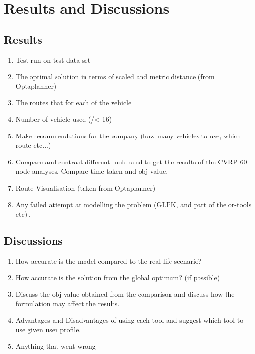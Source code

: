 \chapter{Results and Discussions}
\section{Results}
\begin{enumerate}
\item Test run on test data set
\item The optimal solution in terms of scaled and metric distance (from Optaplanner)
\item The routes that for each of the vehicle
\item Number of vehicle used (/< 16)
\item Make recommendations for the company (how many vehicles to use, which route etc...)
\item Compare and contrast different tools used to get the results of the CVRP 60 node analyses. Compare time taken and obj value.
\item Route Visualisation (taken from Optaplanner)
\item Any failed attempt at modelling the problem (GLPK, and part of the or-tools etc)..
\end{enumerate}

\section{Discussions}
\begin{enumerate}
\item How accurate is the model compared to the real life scenario?
\item How accurate is the solution from the global optimum? (if possible)
\item Discuss the obj value obtained from the comparison and discuss how the formulation may affect the results.
\item Advantages and Disadvantages of using each tool and suggest which tool to use given user profile.
\item Anything that went wrong
\end{enumerate}